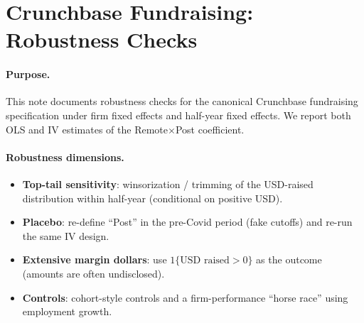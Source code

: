 \documentclass{article}
\newcommand{\cleanedresultsdir}{../results/cleaned/tex}
\begin{document}
\thispagestyle{empty}

\section*{Crunchbase Fundraising: Robustness Checks}

\paragraph{Purpose.}
This note documents robustness checks for the canonical Crunchbase fundraising specification under firm fixed effects and half-year fixed effects.
We report both OLS and IV estimates of the Remote$\times$Post coefficient.

\paragraph{Robustness dimensions.}
\begin{itemize}
  \item \textbf{Top-tail sensitivity}: winsorization / trimming of the USD-raised distribution within half-year (conditional on positive USD).
  \item \textbf{Placebo}: re-define ``Post'' in the pre-Covid period (fake cutoffs) and re-run the same IV design.
  \item \textbf{Extensive margin dollars}: use $1\{\text{USD raised} > 0\}$ as the outcome (amounts are often undisclosed).
  \item \textbf{Controls}: cohort-style controls and a firm-performance ``horse race'' using employment growth.
\end{itemize}

\begin{table}[h!]
\caption{\textbf{Crunchbase Fundraising Robustness Checks}}

\end{table}
\end{document}
